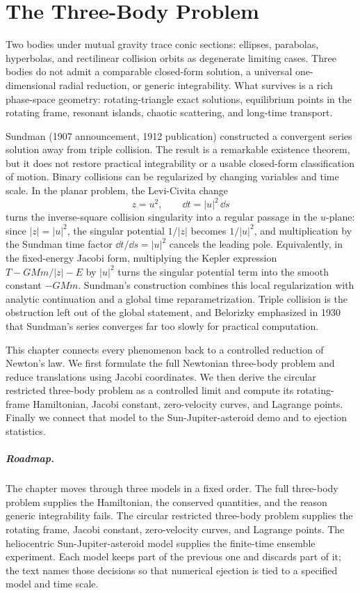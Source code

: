\chapter{The Three-Body Problem}
\label{chap:three-body-problem}

Two bodies under mutual gravity trace conic sections: ellipses, parabolas,
hyperbolas, and rectilinear collision orbits as degenerate limiting cases.
Three bodies do not admit a comparable closed-form solution, a universal
one-dimensional radial reduction, or generic integrability. What survives is a
rich phase-space geometry: rotating-triangle exact solutions, equilibrium
points in the rotating frame, resonant islands, chaotic scattering, and
long-time transport.

Sundman (1907 announcement, 1912 publication) constructed a convergent series
solution away from triple collision.  The result is a remarkable existence
theorem, but it does not restore practical integrability or a usable
closed-form classification of motion. Binary collisions can be regularized by
changing variables and time scale. In the planar problem, the Levi-Civita change
\[
  z=u^2,\qquad \dd t=|u|^2\,\dd s
\]
turns the inverse-square collision singularity into a regular passage in the
\(u\)-plane: since \(|z|=|u|^2\), the singular potential \(1/|z|\) becomes
\(1/|u|^2\), and multiplication by the Sundman time factor
\(\dd t/\dd s=|u|^2\) cancels the leading pole. Equivalently, in the fixed-energy
Jacobi form, multiplying the Kepler expression \(T-GMm/|z|-E\) by \(|u|^2\)
turns the singular potential term into the smooth constant \(-GMm\). Sundman's
construction combines this local regularization with analytic continuation and
a global time reparametrization. Triple collision is the obstruction left out
of the global statement, and Belorizky emphasized in 1930 that Sundman's series
converges far too slowly for practical computation.

This chapter connects every phenomenon back to a controlled reduction of
Newton's law. We first formulate the full Newtonian three-body problem and
reduce translations using Jacobi coordinates. We then derive the circular
restricted three-body problem as a controlled limit and compute its
rotating-frame Hamiltonian, Jacobi constant, zero-velocity curves, and Lagrange
points. Finally we connect that model to the Sun-Jupiter-asteroid demo and to
ejection statistics.

\paragraph{Roadmap.}
The chapter moves through three models in a fixed order. The full three-body
problem supplies the Hamiltonian, the conserved quantities, and the reason
generic integrability fails. The circular restricted three-body problem supplies
the rotating frame, Jacobi constant, zero-velocity curves, and Lagrange points.
The heliocentric Sun-Jupiter-asteroid model supplies the finite-time ensemble
experiment. Each model keeps part of the previous one and discards part of it;
the text names those decisions so that numerical ejection is tied to a specified
model and time scale.

